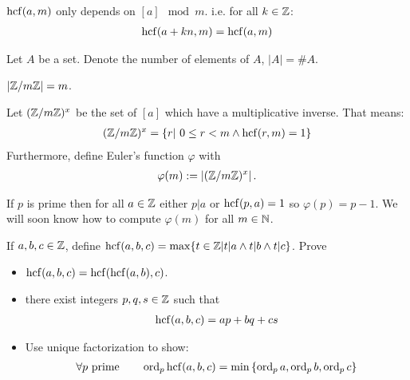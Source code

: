 \begin{rk}
$\operatorname{hcf}(a,m)$ only depends on $[a] \mod m$. i.e. for all $k \in \mathbb Z$:
\begin{align*}
\operatorname{hcf}(a+kn, m ) = \operatorname{hcf}(a,m)
\end{align*}
\end{rk}

\begin{df}
Let $A$ be a set. Denote the number of elements of $A$, $|A| = \# A$. 
\end{df}

\begin{ex}
	$\displaystyle |\mathbb Z/m\mathbb Z| = m$.
\end{ex}

\begin{df}
Let $(\mathbb Z/m\mathbb Z)^x$ be the set of $[a]$ which have a multiplicative inverse. That means:
\begin{align*}
(\mathbb Z/m\mathbb Z)^x =\{r|~0 \le r < m \wedge \operatorname{hcf} (r,m) = 1 \}
\end{align*}
Furthermore, define Euler's function $\varphi$ with
\begin{align*}
\varphi (m) := \left| ( \mathbb Z/m \mathbb Z)^x \right| .
\end{align*}
\end{df}

\begin{ex}
	 If $p$ is prime then for all $a \in \mathbb Z$ either $p|a$ or $\operatorname{hcf}(p,a)=1$ so $\varphi(p) = p-1$. We will soon know how to compute $\varphi(m)$ for all $m \in \mathbb N$.
\end{ex}

\begin{ec}
If $a,b,c \in \mathbb Z$, define $\operatorname{hcf}(a,b,c) = \max \{t \in \mathbb Z | t|a \wedge t|b \wedge t|c\}$. Prove 
\begin{itemize}
	\item
	$\operatorname{hcf}(a,b,c) = \operatorname{hcf}(\operatorname{hcf}(a,b),c)$.
	\item
 there exist integers $p,q,s \in \mathbb Z$ such that 
\begin{align*}
\operatorname{hcf}(a,b,c) = ap + bq + cs
\end{align*}
\item
Use unique factorization to show:
\begin{align*}
\forall p ~\text{prime} \qquad \operatorname{ord}_p \operatorname{hcf} (a,b,c) = \min \left\{\operatorname{ord}_p a, \operatorname{ord}_p b, \operatorname{ord}_p c \right\}
\end{align*}
\end{itemize}
\end{ec}















